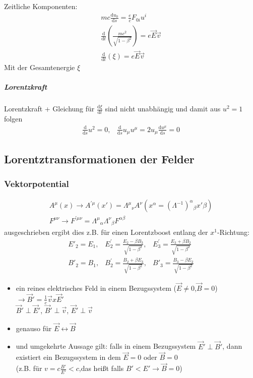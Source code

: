 \documentclass[a4paper]{article}
\begin{document}
Zeitliche Komponenten:
\begin{align}
mc\frac{\mathrm{d}u_0}{\mathrm{d}s}=\frac{e}{c}F_{0i}u^i\\
\frac{\mathrm{d}}{\mathrm{d}t}\left(\frac{mc^2}{\sqrt{1-\beta^2}}\right)=e\vec{E}\vec{v}\\
\frac{\mathrm{d}}{\mathrm{d}t}\left( \xi \right)=e\vec{E}\vec{v}
\end{align}
Mit der Gesamtenergie $\xi$
\subparagraph{Lorentzkraft}
Lorentzkraft + Gleichung für $\frac{\mathrm{d}\xi}{\mathrm{d}t}$ sind nicht unabhängig und damit 
aus $u^2=1$ folgen
\begin{align}
\frac{\mathrm{d}}{\mathrm{d}s}u^2=0, & \frac{\mathrm{d}}{\mathrm{d}s}u_\mu u^\mu=2u_\mu\frac{\mathrm{d}u^\mu}{\mathrm{d}s}=0
\end{align}
\subsection{Lorentztransformationen der Felder}
\subsubsection{Vektorpotential}
\begin{align}
A^\mu(x)\rightarrow A^{'\mu}(x')=\Lambda^\mu{}_\nu
A^\nu(x^\alpha=(\Lambda^{-1})^\alpha{}_\beta x{'\beta})\\
F^{\mu\nu}\rightarrow
F^{'\mu\nu}=\Lambda^\mu{}_\alpha \Lambda^\nu{}_\beta F^{\alpha\beta}
\end{align}
ausgeschrieben ergibt dies z.B. für einen Lorentzboost entlang der
$x^1$-Richtung:
\begin{align}
E'_2=E_1 , & E^{'}_2=\frac{E_2-\beta B_3}{\sqrt{1-\beta^2}} , &
E^{'}_3=\frac{E_3+\beta B_2}{\sqrt{1-\beta^2}}\\
B'_2=B_1 , & B^{'}_2=\frac{B_2+\beta E_3}{\sqrt{1-\beta^2}} , &
B'_3=\frac{B_3-\beta E_2}{\sqrt{1-\beta^2}}
\end{align}
\begin{itemize}
  \item ein reines elektrisches Feld in einem Bezugssystem
  ($\vec{E}\neq0$,$\vec{B}=0$)\\ $\rightarrow
  \vec{B}'=\frac{1}{c}\vec{v}x\vec{E}'$ \\ $\vec{B}'\perp \vec{E}'$,
  $\vec{B}'\perp \vec{v}$, $\vec{E}'\perp \vec{v}$
  \item genauso für $\vec{E}\leftrightarrow\vec{B}$
  \item und umgekehrte Aussage gilt: falls in einem Bezugssystem
  $\vec{E}'\perp\vec{B}'$, dann existiert ein Bezugssystem in dem $\vec{E}=0$
  oder $\vec{B}=0$\\ (z.B. für $v=c\frac{B'}{E'}<c$,das heißt falls
  $B'<E'\rightarrow\vec{B}=0$)
\end{itemize}
\end{document}

